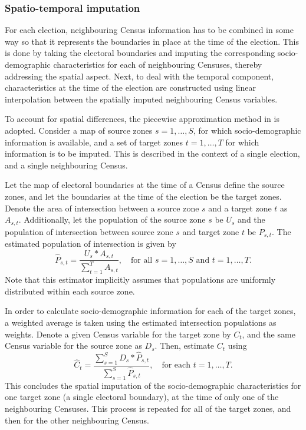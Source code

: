 \documentclass[11pt,a4paper,]{article}
\begin{document}
\subsubsection{Spatio-temporal
imputation}\label{spatio-temporal-imputation}

For each election, neighbouring Census information has to be combined in
some way so that it represents the boundaries in place at the time of
the election. This is done by taking the electoral boundaries and
imputing the corresponding socio-demographic characteristics for each of
neighbouring Censuses, thereby addressing the spatial aspect. Next, to
deal with the temporal component, characteristics at the time of the
election are constructed using linear interpolation between the
spatially imputed neighbouring Census variables.

To account for spatial differences, the piecewise approximation method
in \textcite{Goodchild1993} is adopted. Consider a map of source zones
\(s = 1,\dots,S\), for which socio-demographic information is available,
and a set of target zones \(t = 1,\dots,T\) for which information is to
be imputed. This is described in the context of a single election, and a
single neighbouring Census.

Let the map of electoral boundaries at the time of a Census define the
source zones, and let the boundaries at the time of the election be the
target zones. Denote the area of intersection between a source zone
\(s\) and a target zone \(t\) as \(A_{s,t}\). Additionally, let the
population of the source zone \(s\) be \(U_s\) and the population of
intersection between source zone \(s\) and target zone \(t\) be
\(P_{s,t}\). The estimated population of intersection is given by \[
  \hat{P}_{s,t} = \frac{U_s*A_{s,t}}{\sum_{t=1}^T A_{s,t}},
  \quad\text{for all $s=1,\dots,S$ and $t=1,\dots,T$}.
\] Note that this estimator implicitly assumes that populations are
uniformly distributed within each source zone.

In order to calculate socio-demographic information for each of the
target zones, a weighted average is taken using the estimated
intersection populations as weights. Denote a given Census variable for
the target zone by \(C_t\), and the same Census variable for the source
zone as \(D_s\). Then, estimate \(C_t\) using \[
  \hat{C}_t = \frac{\sum_{s=1}^{S}{D_s*\hat{P}_{s,t}}}%
  {\sum_{s=1}^{S}{\hat{P}_{s,t}}},
  \quad\text{for each $t=1,\dots,T$}.
\] This concludes the spatial imputation of the socio-demographic
characteristics for one target zone (a single electoral boundary), at
the time of only one of the neighbouring Censuses. This process is
repeated for all of the target zones, and then for the other
neighbouring Census.
\end{document}

